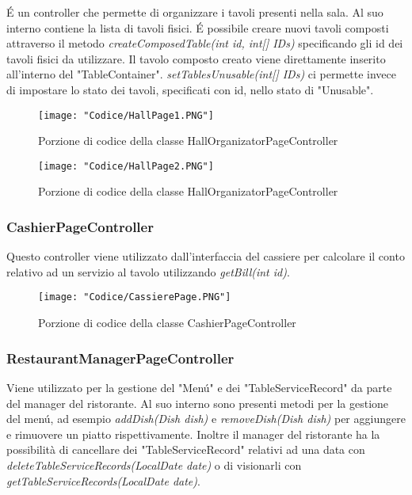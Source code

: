 \documentclass{article}
\begin{document}
\'E un controller che permette di organizzare i tavoli presenti nella sala. Al suo interno contiene la lista di tavoli fisici. \'E possibile creare nuovi tavoli composti attraverso il metodo  \textit{createComposedTable(int id, int[] IDs)} specificando gli id dei tavoli fisici da utilizzare. Il tavolo composto creato viene direttamente inserito all'interno del "TableContainer".
\textit{setTablesUnusable(int[] IDs)} ci permette invece di impostare lo stato dei tavoli, specificati con id, nello stato di "Unusable".

\begin{figure}[!h]
\centering
\texttt{[image: "Codice/HallPage1.PNG"]}
\caption{Porzione di codice della classe HallOrganizatorPageController}
\end{figure}

\begin{figure}[!h]
\centering
\texttt{[image: "Codice/HallPage2.PNG"]}
\caption{Porzione di codice della classe HallOrganizatorPageController}
\end{figure}

\newpage

\subsubsection{CashierPageController}

Questo controller viene utilizzato dall'interfaccia del cassiere per calcolare il conto relativo ad un servizio al tavolo utilizzando \textit{getBill(int id)}.

\begin{figure}[!h]
\centering
\texttt{[image: "Codice/CassierePage.PNG"]}
\caption{Porzione di codice della classe CashierPageController}
\end{figure}

\newpage

\subsubsection{RestaurantManagerPageController}

Viene utilizzato per la gestione del "Men\'u" e dei "TableServiceRecord" da parte del manager del ristorante. Al suo interno sono presenti metodi per la gestione del men\'u, ad esempio \textit{addDish(Dish dish)} e \textit{removeDish(Dish dish)} per aggiungere e rimuovere un piatto rispettivamente. Inoltre il manager del ristorante ha la possibilità di cancellare dei "TableServiceRecord" relativi ad una data con \textit{deleteTableServiceRecords(LocalDate date)} o di visionarli con \textit{getTableServiceRecords(LocalDate date)}.
\end{document}
